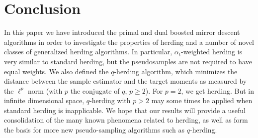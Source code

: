 \documentclass[paper.tex]{subfiles}
\begin{document}
\section{Conclusion} 
\label{sec:conclusion}

In this paper we have introduced the primal and dual boosted mirror descent algorithms in order to investigate the properties of herding and a number of novel classes of generalized herding algorithms. In particular, $\alpha_{t}$-weighted herding is very similar to standard herding, but the pseudosamples are not required to have equal weights. We also defined the $q$-herding algorithm, which minimizes the distance between the sample estimator and the target moments as measured by the $\ell^{p}$ norm (with $p$ the conjugate of $q$, $p \ge 2$). For $p = 2$, we get herding. But in infinite dimensional space, $q$-herding with $p > 2$ may some times be applied when standard herding is inapplicable. We hope that our results will provide a useful consolidation of the many known phenomena related to herding, as well as 
form the basis for more new pseudo-sampling algorithms such as $q$-herding.




\end{document}
